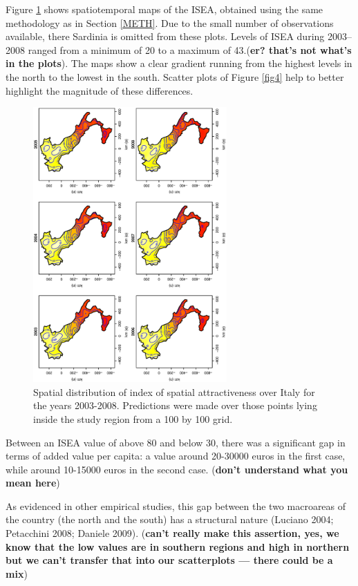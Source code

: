 \documentclass[10pt]{article}
\theoremstyle{definition}
\theoremstyle{plain}
\begin{document}
Figure \ref{fig5} shows spatiotemporal maps of the ISEA, obtained using the same methodology as in Section \ref{METH}. Due to the small number of observations available, there Sardinia is omitted from these plots. Levels of ISEA during 2003--2008 ranged from a minimum of 20 to a maximum of 43.(\textbf{er? that's not what's in the plots}). The maps show a clear gradient running from the highest levels in the north to the lowest in the  south. Scatter plots of Figure \ref{fig4} help to better highlight the magnitude of these differences.

\begin{figure}[htbp]
	\centering
		\includegraphics[width=0.66\textwidth, angle=270]{index.eps}
	\caption{Spatial distribution of index of spatial attractiveness over Italy for the years 2003-2008. Predictions were made over those points lying inside the study region from a 100 by 100 grid.}
	\label{fig5}
\end{figure}

Between an ISEA value of above 80 and below 30, there was a significant gap in terms of added value per capita: a value around 20-30000 euros in the first case, while around 10-15000 euros in the second case. (\textbf{don't understand what you mean here}) 

As evidenced in other empirical studies, this gap between the two macroareas of the country (the north and the south) has a structural nature (Luciano 2004; Petacchini 2008; Daniele 2009). 
(\textbf{can't really make this assertion, yes, we know that the low values are in southern regions and high in northern but we can't transfer that into our scatterplots --- there could be a mix})
\end{document}
